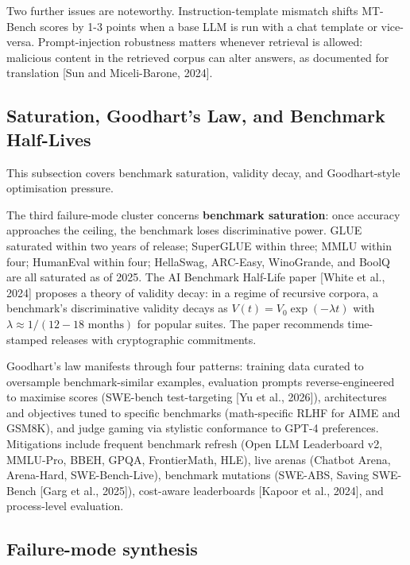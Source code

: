 Two further issues are noteworthy. Instruction-template mismatch shifts MT-Bench scores by 1-3 points when a base LLM is run with a chat template or vice-versa. Prompt-injection robustness matters whenever retrieval is allowed: malicious content in the retrieved corpus can alter answers, as documented for translation {[}Sun and Miceli-Barone, 2024{]}.

\subsection{Saturation, Goodhart's Law, and Benchmark Half-Lives}\label{saturation-goodharts-law-and-benchmark-half-lives}

This subsection covers benchmark saturation, validity decay, and Goodhart-style optimisation pressure.

The third failure-mode cluster concerns \textbf{benchmark saturation}: once accuracy approaches the ceiling, the benchmark loses discriminative power. GLUE saturated within two years of release; SuperGLUE within three; MMLU within four; HumanEval within four; HellaSwag, ARC-Easy, WinoGrande, and BoolQ are all saturated as of 2025. The AI Benchmark Half-Life paper {[}White et al., 2024{]} proposes a theory of validity decay: in a regime of recursive corpora, a benchmark's discriminative validity decays as \(V(t) = V_0 \exp(-\lambda t)\) with \(\lambda \approx 1/(12-18 \text{ months})\) for popular suites. The paper recommends time-stamped releases with cryptographic commitments.

Goodhart's law manifests through four patterns: training data curated to oversample benchmark-similar examples, evaluation prompts reverse-engineered to maximise scores (SWE-bench test-targeting {[}Yu et al., 2026{]}), architectures and objectives tuned to specific benchmarks (math-specific RLHF for AIME and GSM8K), and judge gaming via stylistic conformance to GPT-4 preferences. Mitigations include frequent benchmark refresh (Open LLM Leaderboard v2, MMLU-Pro, BBEH, GPQA, FrontierMath, HLE), live arenas (Chatbot Arena, Arena-Hard, SWE-Bench-Live), benchmark mutations (SWE-ABS, Saving SWE-Bench {[}Garg et al., 2025{]}), cost-aware leaderboards {[}Kapoor et al., 2024{]}, and process-level evaluation.

\subsection{Failure-mode synthesis}\label{failure-mode-synthesis}


